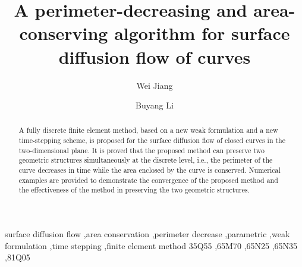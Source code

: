\documentclass[review]{elsarticle}
\begin{document}
\begin{frontmatter}

\title{A perimeter-decreasing and area-conserving algorithm for surface diffusion flow of curves}


\author[mymainaddress]{Wei Jiang}

\author[mysecondaryaddress]{Buyang Li}

\address[mymainaddress]{School of Mathematics and Statistics $\&$ Hubei Key Laboratory of Computational Science, Wuhan University, Wuhan 430072, P. R. China.}
\address[mysecondaryaddress]{Department of Applied Mathematics, The Hong Kong Polytechnic University, Hong Kong.}

\begin{abstract}
A fully discrete finite element method, based on a new weak formulation and a new time-stepping scheme, is proposed for the surface diffusion flow of closed curves in the two-dimensional plane. It is proved that the proposed method can preserve two geometric structures simultaneously at the discrete level, i.e.,  the perimeter of the curve decreases in time while the area enclosed by the curve is conserved. Numerical examples are provided to demonstrate the convergence of the proposed method and the effectiveness of the method in preserving the two geometric structures.
\end{abstract}

\begin{keyword}
surface diffusion flow \sep area conservation \sep perimeter decrease \sep parametric \sep weak formulation \sep time stepping \sep finite element method
\MSC[2010] 35Q55 \sep 65M70 \sep 65N25 \sep 65N35 \sep 81Q05
\end{keyword}

\end{frontmatter}

\end{document}

